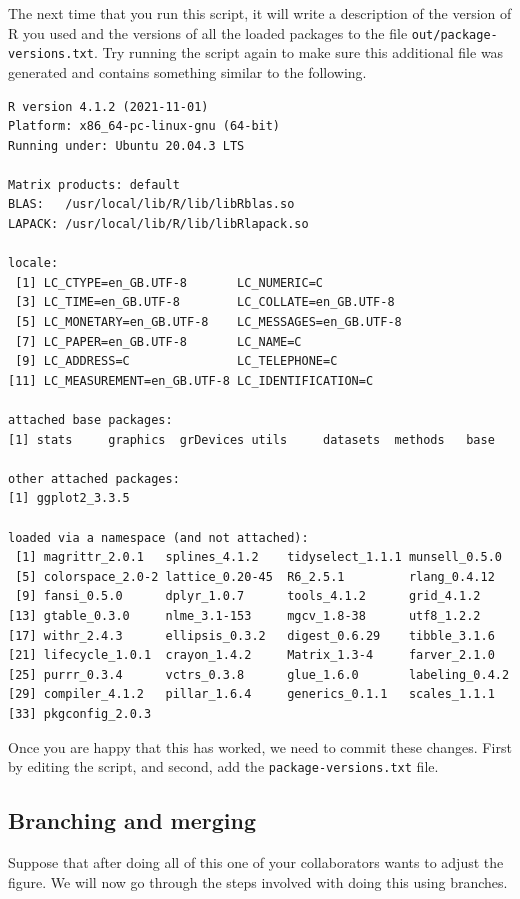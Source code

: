 \documentclass[11pt,onecolumn]{scrartcl}
\begin{document}
The next time that you run this script, it will write a description of the
version of R you used and the versions of all the loaded packages to the file
\texttt{out/package-versions.txt}. Try running the script again to make sure this
additional file was generated and contains something similar to the following.

\begin{Verbatim}[frame=single,framerule=0.5mm,framesep=2mm,label=Session information,xleftmargin=5mm,xrightmargin=5mm,fontsize=\small]
R version 4.1.2 (2021-11-01)
Platform: x86_64-pc-linux-gnu (64-bit)
Running under: Ubuntu 20.04.3 LTS

Matrix products: default
BLAS:   /usr/local/lib/R/lib/libRblas.so
LAPACK: /usr/local/lib/R/lib/libRlapack.so

locale:
 [1] LC_CTYPE=en_GB.UTF-8       LC_NUMERIC=C
 [3] LC_TIME=en_GB.UTF-8        LC_COLLATE=en_GB.UTF-8
 [5] LC_MONETARY=en_GB.UTF-8    LC_MESSAGES=en_GB.UTF-8
 [7] LC_PAPER=en_GB.UTF-8       LC_NAME=C
 [9] LC_ADDRESS=C               LC_TELEPHONE=C
[11] LC_MEASUREMENT=en_GB.UTF-8 LC_IDENTIFICATION=C

attached base packages:
[1] stats     graphics  grDevices utils     datasets  methods   base

other attached packages:
[1] ggplot2_3.3.5

loaded via a namespace (and not attached):
 [1] magrittr_2.0.1   splines_4.1.2    tidyselect_1.1.1 munsell_0.5.0
 [5] colorspace_2.0-2 lattice_0.20-45  R6_2.5.1         rlang_0.4.12
 [9] fansi_0.5.0      dplyr_1.0.7      tools_4.1.2      grid_4.1.2
[13] gtable_0.3.0     nlme_3.1-153     mgcv_1.8-38      utf8_1.2.2
[17] withr_2.4.3      ellipsis_0.3.2   digest_0.6.29    tibble_3.1.6
[21] lifecycle_1.0.1  crayon_1.4.2     Matrix_1.3-4     farver_2.1.0
[25] purrr_0.3.4      vctrs_0.3.8      glue_1.6.0       labeling_0.4.2
[29] compiler_4.1.2   pillar_1.6.4     generics_0.1.1   scales_1.1.1
[33] pkgconfig_2.0.3
\end{Verbatim}

Once you are happy that this has worked, we need to commit these changes. First
by editing the script, and second, add the \texttt{package-versions.txt} file.

\subsection{Branching and merging}
\label{sec:orga8bc06b}

Suppose that after doing all of this one of your collaborators wants to adjust
the figure. We will now go through the steps involved with doing this using
branches.
\end{document}
